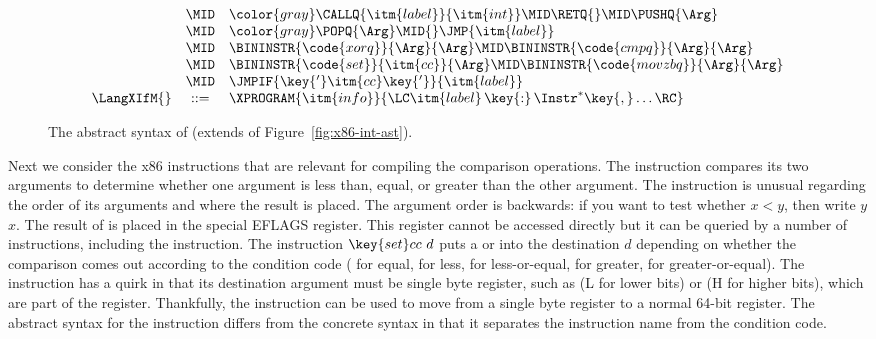 \documentclass[7x10]{TimesAPriori_MIT}%
\newcommand{\gray}[1]{{\color{gray} #1}}
\def\racketEd{0}
\def\pythonEd{1}
\def\edition{1}
\newcommand{\racket}[1]{{\if\edition\racketEd{#1}\fi}}
\newcommand{\python}[1]{{\if\edition\pythonEd #1\fi}}
\begin{document}
\begin{figure}[tp]
{\begin{minipage}{0.98\textwidth}
{\[\begin{array}{lcl}
       &\MID& \gray{ \CALLQ{\itm{label}}{\itm{int}} \MID \RETQ{} 
       \MID \PUSHQ{\Arg}} \\
       &\MID& \gray{ \POPQ{\Arg} \MID \racket{\JMP{\itm{label}}} } \python{\JMP{\itm{label}}}\\
       &\MID& \BININSTR{\code{xorq}}{\Arg}{\Arg}
       \MID \BININSTR{\code{cmpq}}{\Arg}{\Arg}\\
       &\MID& \BININSTR{\code{set}}{\itm{cc}}{\Arg} 
       \MID \BININSTR{\code{movzbq}}{\Arg}{\Arg}\\
       &\MID&  \JMPIF{\key{'}\itm{cc}\key{'}}{\itm{label}} \\
\LangXIfM{} &::= & \XPROGRAM{\itm{info}}{\LC\itm{label} \,\key{:}\, \Instr^{*} \key{,} \ldots \RC }
\end{array}
\]
\fi}
\end{minipage}
}
\caption{The abstract syntax of \LangXIf{} (extends \LangXInt{} of Figure~\ref{fig:x86-int-ast}).}
\label{fig:x86-1}
\end{figure}

Next we consider the x86 instructions that are relevant for compiling
the comparison operations. The  instruction compares its two
arguments to determine whether one argument is less than, equal, or
greater than the other argument. The  instruction is unusual
regarding the order of its arguments and where the result is
placed. The argument order is backwards: if you want to test whether
$x < y$, then write  $y$\code{,} $x$. The result of
 is placed in the special EFLAGS register. This register
cannot be accessed directly but it can be queried by a number of
instructions, including the  instruction. The instruction
$\key{set}cc~d$ puts a  or  into the destination $d$
depending on whether the comparison comes out according to the
condition code  ( for equal,  for less, 
for less-or-equal,  for greater,  for
greater-or-equal).  The  instruction has a quirk in
that its destination argument must be single byte register, such as
 (L for lower bits) or  (H for higher bits), which
are part of the  register.  Thankfully, the 
instruction can be used to move from a single byte register to a
normal 64-bit register.  The abstract syntax for the 
instruction differs from the concrete syntax in that it separates the
instruction name from the condition code.
\end{document}
